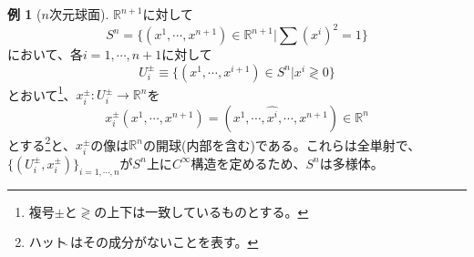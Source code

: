 \documentclass[unicode,a4paper,11pt]{ltjsarticle}
\theoremstyle{definition}
\newtheorem{exm}{例}[section]
\begin{document}
\begin{exm}[$n$次元球面]
  $\mathbb{R}^{n+1}$に対して
  \begin{equation}
    S^{n}
    =
    \{
    (x^{1},\cdots,x^{n+1})\in\mathbb{R}^{n+1}
    |
    \sum (x^{i})^2=1
    \}
  \end{equation}
  において、各$i=1,\cdots,n+1$に対して
  \begin{equation}
    U_{i}^{\pm}
    \equiv
    \{
    (x^{1},\cdots,x^{i+1})\in S^{n}
    |
    x^{i}\gtrless 0
    \}
  \end{equation}
  とおいて\footnote{
    複号$\pm$と$\gtrless$の上下は一致しているものとする。
  }、$x_{i}^{\pm}:U_{i}^{\pm}\rightarrow\mathbb{R}^{n}$を
  \begin{equation}
    x_{i}^{\pm}(x^{1},\cdots,x^{n+1})
    =
    (x^{1},\cdots,\widehat{x^{i}},\cdots,x^{n+1})
    \in \mathbb{R}^{n}
  \end{equation}
  とする\footnote{
    ハット$\widehat{\ }$はその成分がないことを表す。
  }と、$x^{\pm}_{i}$の像は$\mathbb{R}^{n}$の開球(内部を含む)である。これらは全単射で、$\{(U_{i}^{\pm},x_{i}^{\pm})\}_{i=1,\cdots,n}$が$S^{n}$上に$C^{\infty}$構造を定めるため、$S^{n}$は多様体。
\end{exm}
\end{document}
